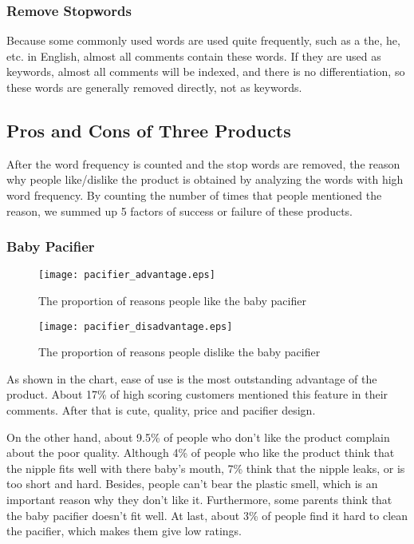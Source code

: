 \documentclass{mcmthesis}
\begin{document}
	\subsubsection{Remove Stopwords}
	Because some commonly used words are used quite frequently, such as a the, he, etc. in English, almost all comments contain these words. If they are used as keywords, almost all comments will be indexed, and there is no differentiation, so these words are generally removed directly, not as keywords.
	
	
	\subsection{Pros and Cons of Three Products}
	
	After the word frequency is counted and the stop words are removed, the reason why people like/dislike the product is obtained by analyzing the words with high word frequency.
	By counting the number of times that people mentioned the reason, we summed up 5 factors of success or failure of these products.
	\subsubsection{Baby Pacifier}
	\begin{figure}[H]
		\begin{minipage}[t]{0.5\textwidth}
			\centering
			\texttt{[image: pacifier\_advantage.eps]}
			\caption{The proportion of reasons people like the baby pacifier\label{fig:1}}
		\end{minipage}
		\qquad
		\begin{minipage}[t]{0.5\textwidth}
			\centering
			\texttt{[image: pacifier\_disadvantage.eps]}
			\caption{The proportion of reasons people dislike the baby pacifier\label{fig:2}}
		\end{minipage}
	\end{figure}
	
	As shown in the chart, ease of use is the most outstanding advantage of the product. About 17\% of high scoring customers mentioned this feature in their comments. After that is cute, quality, price and pacifier design.
	
	
	On the other hand, about 9.5\% of people who don't like the product complain
	about the poor quality. Although 4\% of people who like the product think that the nipple fits well with there baby's mouth, 7\%  think that the nipple leaks, or is too short and hard. Besides, people can't bear the plastic smell, which is an important reason why they don't like it. Furthermore, some parents think that the baby pacifier doesn't fit well. At last, about 3\% of people find it hard to clean the pacifier, which makes them give low ratings.
	
\end{document}
